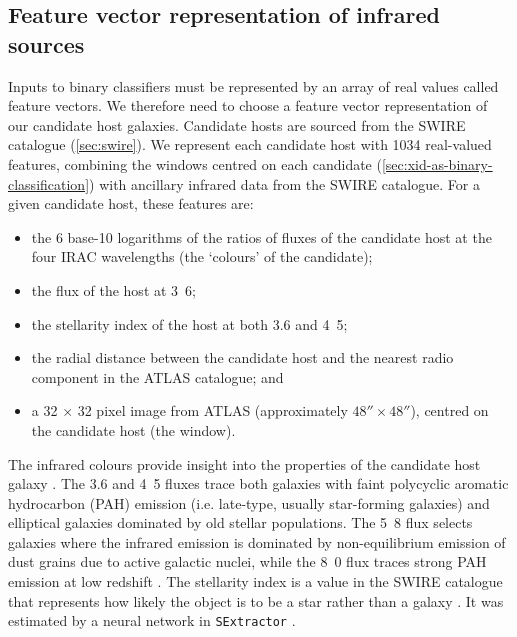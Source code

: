 \documentclass[fleqn,usenatbib,usedcolumn]{mnras}
\newcommand{\edited}[1]{#1}
\begin{document}
  \subsection{Feature vector representation of infrared sources}
  \label{vector-representation-of-infrared-sources}

    \edited{Inputs to binary classifiers must be represented by an array of real values called feature vectors.} We therefore need to choose a feature vector representation of our candidate host galaxies. Candidate hosts are sourced from the SWIRE catalogue (\autoref{sec:swire}). We represent each candidate host with 1034 real-valued features, \edited{combining the windows centred on each candidate (\autoref{sec:xid-as-binary-classification}) with ancillary infrared data from the SWIRE catalogue}. For a given candidate host, these features are:
    \begin{itemize}
      \item the 6 base-10 logarithms of the ratios of fluxes of the candidate
        host at the four IRAC wavelengths \edited{(the `colours' of the candidate)};
      \item the flux of the host at \unit{3.6}{\micro\meter};
      \item the stellarity index of the host at both 3.6 and
        \unit{4.5}{\micro\meter};
      \item the radial distance between the candidate host and the nearest
        radio component in the ATLAS catalogue; and
      \item a 32 $\times$ 32 pixel image from ATLAS (approximately $48''
        \times 48''$), centred on the candidate host \edited{(the window)}.
    \end{itemize}

    The infrared colours provide insight into the properties \edited{of the candidate
    host galaxy} \citep{grant11polarised}. The 3.6 and \unit{4.5}{\micro\meter} fluxes trace
    both galaxies with faint polycyclic aromatic hydrocarbon (PAH) emission \edited{(i.e. late-type, usually star-forming galaxies)}
    and elliptical galaxies dominated by old stellar populations. The
    \unit{5.8}{\micro\meter} flux selects galaxies where the infrared emission
    is dominated by non-equilibrium emission of dust grains \edited{due to active galactic nuclei},
    while the \unit{8.0}{\micro\meter} flux
    traces strong PAH emission at low redshift \citep{Sajina2005}. The
    stellarity index \edited{is a value in the SWIRE catalogue that represents how likely the object is to be a star rather
    than a galaxy \citep{surace05swire}. It was estimated by a neural network in
    \texttt{SExtractor} \citep{bertin96sextractor}}.
\end{document}
